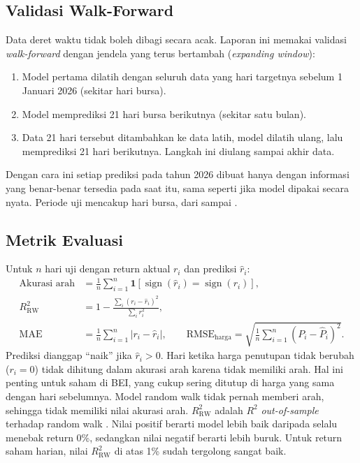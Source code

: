\documentclass[11pt,a4paper]{article}
\begin{document}
\subsection{Validasi Walk-Forward}
Data deret waktu tidak boleh dibagi secara acak. Laporan ini memakai validasi
\emph{walk-forward} dengan jendela yang terus bertambah (\emph{expanding window}):
\begin{enumerate}
  \item Model pertama dilatih dengan seluruh data yang hari targetnya sebelum 1 Januari 2026
        (sekitar \JumlahLatih{} hari bursa).
  \item Model memprediksi 21 hari bursa berikutnya (sekitar satu bulan).
  \item Data 21 hari tersebut ditambahkan ke data latih, model dilatih ulang, lalu memprediksi
        21 hari berikutnya. Langkah ini diulang sampai akhir data.
\end{enumerate}
Dengan cara ini setiap prediksi pada tahun 2026 dibuat hanya dengan informasi yang
benar-benar tersedia pada saat itu, sama seperti jika model dipakai secara nyata.
Periode uji mencakup \JumlahHariUji{} hari bursa, dari \UjiAwal{} sampai \UjiAkhir.

\subsection{Metrik Evaluasi}
Untuk $n$ hari uji dengan return aktual $r_i$ dan prediksi $\hat r_i$:
\begin{align}
  \text{Akurasi arah} &= \frac{1}{n}\sum_{i=1}^{n} \mathbf{1}\!\left[\operatorname{sign}(\hat r_i) = \operatorname{sign}(r_i)\right], \\
  R^2_{\mathrm{RW}} &= 1 - \frac{\sum_i (r_i - \hat r_i)^2}{\sum_i r_i^2}, \\
  \text{MAE} &= \frac{1}{n}\sum_{i=1}^{n} |r_i - \hat r_i|, \qquad
  \text{RMSE}_{\text{harga}} = \sqrt{\frac{1}{n}\sum_{i=1}^{n} (P_i - \hat P_i)^2}.
\end{align}
Prediksi dianggap ``naik'' jika $\hat r_i > 0$. Hari ketika harga penutupan tidak berubah
($r_i = 0$) tidak dihitung dalam akurasi arah karena tidak memiliki arah. Hal ini penting
untuk saham di BEI, yang cukup sering ditutup di harga yang sama dengan hari sebelumnya.
Model random walk tidak pernah memberi arah, sehingga tidak memiliki nilai akurasi arah. $R^2_{\mathrm{RW}}$ adalah $R^2$
\emph{out-of-sample} terhadap random walk \citep{campbell2008}. Nilai positif berarti model
lebih baik daripada selalu menebak return 0\%, sedangkan nilai negatif berarti lebih buruk.
Untuk return saham harian, nilai $R^2_{\mathrm{RW}}$ di atas 1\% sudah tergolong sangat baik.
\end{document}

